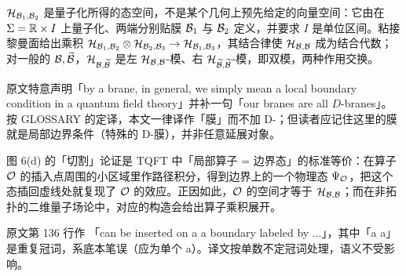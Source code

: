 \begin{yizhu}[易错点]
${\cal H}_{{\cal B}_1,{\cal B}_2}$ 是量子化所得的态空间，不是某个几何上预先给定的向量空间：它由在 $\Sigma=\Bbb{R}\times I$ 上量子化、两端分别贴膜 ${\cal B}_1$ 与 ${\cal B}_2$ 定义，并要求 $I$ 是单位区间。粘接黎曼面给出乘积 ${\cal H}_{{\cal B}_1,{\cal B}_2}\otimes{\cal H}_{{\cal B}_2,{\cal B}_3}\to{\cal H}_{{\cal B}_1,{\cal B}_3}$，其结合律使 ${\cal H}_{{\cal B},{\cal B}}$ 成为结合代数；对一般的 ${\cal B},\tilde{\cal B}$，${\cal H}_{{\cal B},\tilde{\cal B}}$ 是左 ${\cal H}_{{\cal B},{\cal B}}$-模、右 ${\cal H}_{\tilde{\cal B},\tilde{\cal B}}$-模，即双模，两种作用交换。
\end{yizhu}

\begin{yizhu}[含糊点拨]
原文特意声明「by a brane, in general, we simply mean a local boundary condition in a quantum field theory」并补一句「our branes are all $D$-branes」。按 GLOSSARY 的定译，本文一律译作「膜」而不加 D-；但读者应记住这里的膜就是局部边界条件（特殊的 D-膜），并非任意延展对象。
\end{yizhu}

\begin{yizhu}[物理图像]
图 6(d) 的「切割」论证是 TQFT 中「局部算子 = 边界态」的标准等价：在算子 ${\EUO}$ 的插入点周围的小区域里作路径积分，得到边界上的一个物理态 $\Psi_{\EUO}$，把这个态插回虚线处就复现了 ${\EUO}$ 的效应。正因如此，${\EUO}$ 的空间才等于 ${\cal H}_{{\cal B},{\cal B}}$；而在非拓扑的二维量子场论中，对应的构造会给出算子乘积展开。
\end{yizhu}

\begin{yizhu}[原文疑误]
原文第 136 行作 「can be inserted on a a boundary labeled by ...」，其中「a a」是重复冠词，系底本笔误（应为单个 a）。译文按单数不定冠词处理，语义不受影响。
\end{yizhu}
